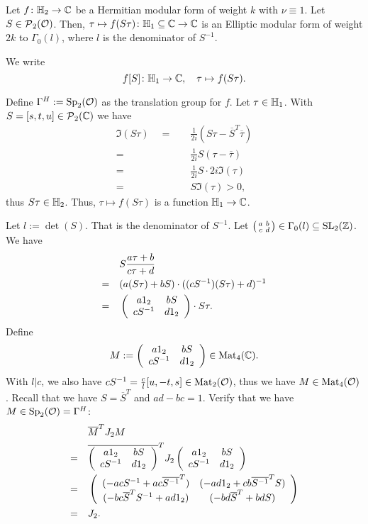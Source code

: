 \begin{lemma}[Restriction]
\label{lemma:ellipticRestriction}
Let $f \colon \mathbb{H}_2 \rightarrow \mathbb{C}$ be a Hermitian modular form of weight $k$ with $\nu \equiv 1$. Let $S \in \operatorname{\mathcal{P}}_2(\mathcal{O})$.
Then, $\tau \mapsto f(S \tau) \colon \mathbb{H}_1 \subseteq \mathbb{C} \rightarrow \mathbb{C}$ is an Elliptic modular form of weight $2k$ to $\Gamma_0(l)$, where $l$ is the denominator of $S^{-1}$.  %

We write
\[  f[S] \colon \mathbb{H}_1 \rightarrow \mathbb{C}, \quad \tau \mapsto f(S \tau) . \]

\proof
Define $\Gamma^H := \operatorname{Sp}_2(\mathcal{O})$ as the translation group for $f$.
Let $\tau \in \mathbb{H}_1$. With $S = [s,t,u] \in \operatorname{\mathcal{P}}_2(\mathbb{C})$ we have
\begin{align*}
\Im(S\tau) \quad = \quad& \frac{1}{2i} \left( S \tau - \overline{S}^T \overline{\tau} \right) \\
= \quad & \frac{1}{2i} S (\tau - \overline{\tau}) \\
= \quad & \frac{1}{2i} S \cdot 2i \Im(\tau) \\
= \quad & S \Im(\tau) > 0 ,
\end{align*}
thus $S \tau \in \mathbb{H}_2$. Thus, $\tau \mapsto f(S \tau)$ is a function $\mathbb{H}_1 \rightarrow \mathbb{C}$.

Let $l := \det(S)$. That is the denominator of $S^{-1}$. Let $\left( \begin{smallmatrix} a & b \\ c & d \end{smallmatrix} \right) \in \Gamma_0(l) \subseteq \operatorname{SL}_2(\mathbb{Z})$. We have
\begin{align*}
& S \frac{a \tau + b}{c \tau + d} \\
=\quad & (a (S \tau) + bS) \cdot ((c S^{-1}) (S \tau) + d)^{-1} \\
=\quad & \left( \begin{array}{cc} a 1_2 & b S \\ c S^{-1} & d 1_2 \end{array} \right) \cdot S \tau .
\end{align*}
Define
\[ M := \left( \begin{array}{cc} a 1_2 & b S \\ c S^{-1} & d 1_2 \end{array} \right) \in \operatorname{Mat}_4(\mathbb{C}) . \]
With $l | c$, we also have $c S^{-1} = \frac{c}{l} [u, -t, s] \in \operatorname{Mat}_2(\mathcal{O})$, thus we have $M \in \operatorname{Mat}_4(\mathcal{O})$.
Recall that we have $S = \overline{S}^T$ and $ad  - bc = 1$. Verify that we have $M \in \operatorname{Sp}_2(\mathcal{O}) = \Gamma^H$:
\begin{align*}
&  \overline{M}^T J_2 M \\
=\quad & \overline{\left( \begin{array}{cc} a 1_2 & b S \\ c S^{-1} & d 1_2 \end{array} \right)}^T J_2 \left( \begin{array}{cc} a 1_2 & b S \\ c S^{-1} & d 1_2 \end{array} \right) \\
=\quad & \left( \begin{array}{cc} (-ac S^{-1} + ac \overline{S^{-1}}^T) & (-ad 1_2 + cb \overline{S^{-1}}^T S) \\ (-bc \overline{S}^T S^{-1} + ad 1_2) & (-bd \overline{S}^T + bd S) \end{array} \right) \\
=\quad & J_2 .
\end{align*}


\end{lemma}
